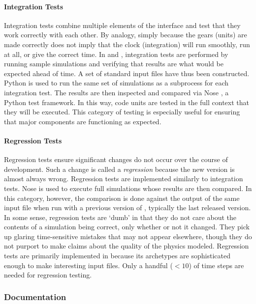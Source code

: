 \paragraph{Integration Tests} 

Integration tests combine multiple elements of the 
\Cyclus interface and test that they work correctly with each other.  By analogy, 
simply because the gears (units) are made correctly does not imply that the 
clock (integration) will run smoothly, run at all, or give the correct time.
In \Cyclus and \Cycamore, integration tests are performed by running sample
simulations and verifying that results are what would be expected ahead of 
time. A set of standard input files have thus been constructed. 
Python is used to run the same set of \Cyclus simulations as a subprocess for each integration test.  The results are then inspected and compared via Nose \cite{pellerin_nose_2007}, a Python test framework.
In this way, \Cyclus code units are tested in the full context that they will be
executed. This category of testing is especially useful for ensuring that 
major \Cyclus components are functioning as expected.

\paragraph{Regression Tests}

Regression tests ensure significant changes do not 
occur over the course of \Cyclus development. Such a change is called a 
\emph{regression} because the new version is almost always wrong.
Regression tests are implemented similarly to integration tests.
Nose is used to execute full \Cyclus simulations whose results
are then compared. In this category, however, the comparison is done against 
the output of the same input file when run with a previous version of \Cyclus, 
typically the last released version.
In some sense, regression tests are `dumb' in that they do 
not care about the contents of a simulation being correct, only whether or not 
it changed. They pick up glaring time-sensitive mistakes that may 
not appear elsewhere, though they do not purport to make claims about the
quality of the physics modeled. Regression tests are primarily implemented
in \Cycamore because its archetypes are sophisticated enough
to make interesting input files. Only a handful ($<10$) of time steps are needed 
for regression testing.

\subsubsection{Documentation}

